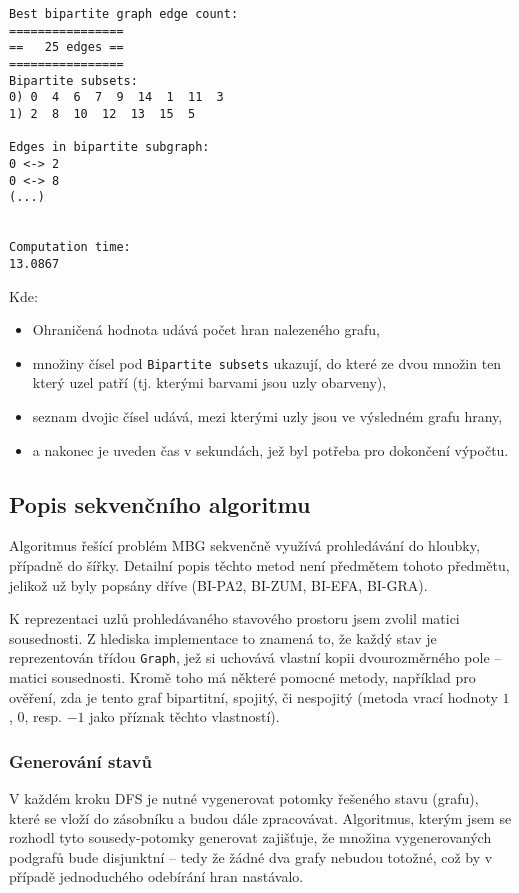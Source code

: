 \documentclass[czech]{article}
\begin{document}
\begin{verbatim}
Best bipartite graph edge count:
================
==   25 edges ==
================
Bipartite subsets:
0) 0  4  6  7  9  14  1  11  3
1) 2  8  10  12  13  15  5

Edges in bipartite subgraph:
0 <-> 2
0 <-> 8
(...)


Computation time:
13.0867
\end{verbatim}

\noindent Kde: 
\begin{itemize}
	\item Ohraničená hodnota udává počet hran nalezeného grafu,
	\item množiny čísel pod \texttt{Bipartite subsets} ukazují, do které ze dvou množin ten který uzel patří (tj. kterými barvami jsou uzly obarveny),
	\item seznam dvojic čísel udává, mezi kterými uzly jsou ve výsledném grafu hrany,
	\item a nakonec je uveden čas v sekundách, jež byl potřeba pro dokončení výpočtu.
\end{itemize}
\subsection{Popis sekvenčního algoritmu}
Algoritmus řešící problém MBG sekvenčně využívá prohledávání do hloubky, případně do šířky. Detailní popis těchto metod není předmětem tohoto předmětu, jelikož už byly popsány dříve (BI-PA2, BI-ZUM, BI-EFA, BI-GRA).

K reprezentaci uzlů prohledávaného stavového prostoru jsem zvolil matici sousednosti. Z hlediska implementace to znamená to, že každý stav je reprezentován třídou \texttt{Graph}, jež si uchovává vlastní kopii dvourozměrného pole -- matici sousednosti. Kromě toho má některé pomocné metody, například pro ověření, zda je tento graf bipartitní, spojitý, či nespojitý (metoda vrací hodnoty $1$, $0$, resp. $-1$ jako příznak těchto vlastností).

\subsubsection{Generování stavů}
V každém kroku DFS je nutné vygenerovat potomky řešeného stavu (grafu), které se vloží do zásobníku a budou dále zpracovávat. Algoritmus, kterým jsem se rozhodl tyto sousedy-potomky generovat zajišťuje, že množina vygenerovaných podgrafů bude disjunktní -- tedy že žádné dva grafy nebudou totožné, což by v případě jednoduchého odebírání hran nastávalo.
\end{document}
